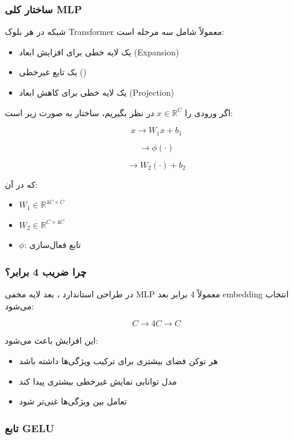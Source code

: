 \documentclass{article}
\begin{document}
\subsubsection*{ساختار کلی MLP}

شبکه  در هر بلوک Transformer معمولاً شامل سه مرحله است:

\begin{itemize}
	\item یک لایه خطی برای افزایش ابعاد (Expansion)
	\item یک تابع غیرخطی ()
	\item یک لایه خطی برای کاهش ابعاد (Projection)
\end{itemize}

اگر ورودی را \( x \in \mathbb{R}^{C} \) در نظر بگیریم، ساختار به صورت زیر است:

\[
x \rightarrow W_1 x + b_1
\]

\[
\rightarrow \phi(\cdot)
\]

\[
\rightarrow W_2 (\cdot) + b_2
\]

که در آن:

\begin{itemize}
	\item \( W_1 \in \mathbb{R}^{4C \times C} \)
	\item \( W_2 \in \mathbb{R}^{C \times 4C} \)
	\item \( \phi \): تابع فعال‌سازی
\end{itemize}

\subsubsection*{چرا ضریب 4 برابر؟}

در طراحی استاندارد ، بعد لایه مخفی MLP معمولاً 4 برابر بعد embedding انتخاب می‌شود:

\[
C \rightarrow 4C \rightarrow C
\]

این افزایش باعث می‌شود:

\begin{itemize}
	\item هر توکن فضای بیشتری برای ترکیب ویژگی‌ها داشته باشد
	\item مدل توانایی نمایش غیرخطی بیشتری پیدا کند
	\item تعامل بین ویژگی‌ها غنی‌تر شود
\end{itemize}

\subsubsection*{تابع GELU}
\end{document}
